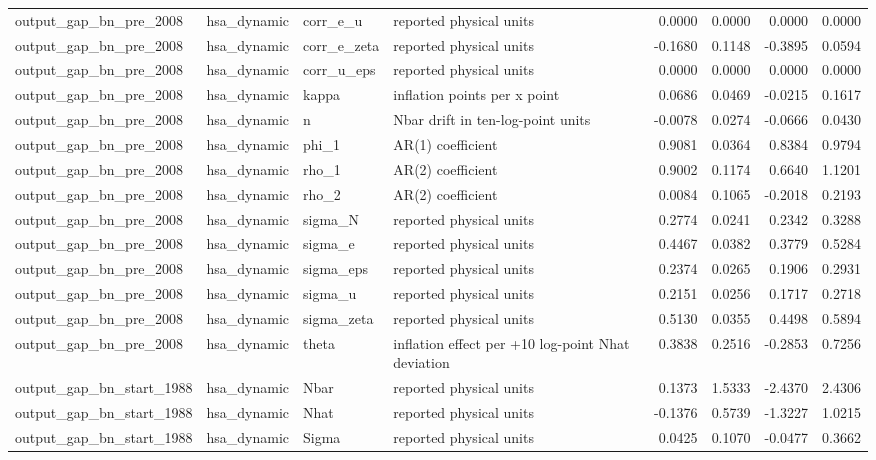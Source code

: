 \begin{tabular}{llllrrrr}
output\_gap\_bn\_pre\_2008 & hsa\_dynamic & corr\_e\_u & reported physical units & 0.0000 & 0.0000 & 0.0000 & 0.0000 \\
output\_gap\_bn\_pre\_2008 & hsa\_dynamic & corr\_e\_zeta & reported physical units & -0.1680 & 0.1148 & -0.3895 & 0.0594 \\
output\_gap\_bn\_pre\_2008 & hsa\_dynamic & corr\_u\_eps & reported physical units & 0.0000 & 0.0000 & 0.0000 & 0.0000 \\
output\_gap\_bn\_pre\_2008 & hsa\_dynamic & kappa & inflation points per x point & 0.0686 & 0.0469 & -0.0215 & 0.1617 \\
output\_gap\_bn\_pre\_2008 & hsa\_dynamic & n & Nbar drift in ten-log-point units & -0.0078 & 0.0274 & -0.0666 & 0.0430 \\
output\_gap\_bn\_pre\_2008 & hsa\_dynamic & phi\_1 & AR(1) coefficient & 0.9081 & 0.0364 & 0.8384 & 0.9794 \\
output\_gap\_bn\_pre\_2008 & hsa\_dynamic & rho\_1 & AR(2) coefficient & 0.9002 & 0.1174 & 0.6640 & 1.1201 \\
output\_gap\_bn\_pre\_2008 & hsa\_dynamic & rho\_2 & AR(2) coefficient & 0.0084 & 0.1065 & -0.2018 & 0.2193 \\
output\_gap\_bn\_pre\_2008 & hsa\_dynamic & sigma\_N & reported physical units & 0.2774 & 0.0241 & 0.2342 & 0.3288 \\
output\_gap\_bn\_pre\_2008 & hsa\_dynamic & sigma\_e & reported physical units & 0.4467 & 0.0382 & 0.3779 & 0.5284 \\
output\_gap\_bn\_pre\_2008 & hsa\_dynamic & sigma\_eps & reported physical units & 0.2374 & 0.0265 & 0.1906 & 0.2931 \\
output\_gap\_bn\_pre\_2008 & hsa\_dynamic & sigma\_u & reported physical units & 0.2151 & 0.0256 & 0.1717 & 0.2718 \\
output\_gap\_bn\_pre\_2008 & hsa\_dynamic & sigma\_zeta & reported physical units & 0.5130 & 0.0355 & 0.4498 & 0.5894 \\
output\_gap\_bn\_pre\_2008 & hsa\_dynamic & theta & inflation effect per +10 log-point Nhat deviation & 0.3838 & 0.2516 & -0.2853 & 0.7256 \\
output\_gap\_bn\_start\_1988 & hsa\_dynamic & Nbar & reported physical units & 0.1373 & 1.5333 & -2.4370 & 2.4306 \\
output\_gap\_bn\_start\_1988 & hsa\_dynamic & Nhat & reported physical units & -0.1376 & 0.5739 & -1.3227 & 1.0215 \\
output\_gap\_bn\_start\_1988 & hsa\_dynamic & Sigma & reported physical units & 0.0425 & 0.1070 & -0.0477 & 0.3662 \\

\end{tabular}
